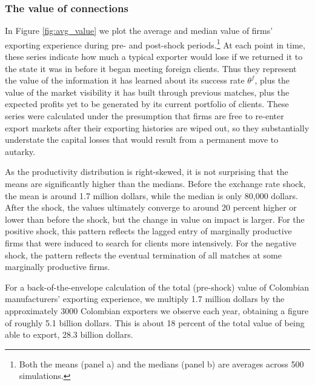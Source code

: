 \documentclass[12pt]{article}
\begin{document}
\subsubsection{The value of connections}

In Figure \ref{fig:avg_value} we plot the average and median value of firms' exporting experience during pre- and post-shock periods.\footnote{%
Both the means (panel a) and the medians (panel b) are averages across 500 simulations.} At each point in time, these series indicate how much a typical exporter would lose if we returned it to the state it was in before it began meeting foreign clients. Thus they represent the value of the information it has learned about its success rate $\theta ^{f}$, plus the value of the market visibility it has built through previous matches, plus the expected profits yet to be generated by its current portfolio of clients. These series were calculated under the presumption that firms are free to re-enter export markets after their exporting histories are wiped out, so they substantially understate the capital losses that would result from a permanent move to autarky.

As the productivity distribution is right-skewed, it is not surprising that the means are significantly higher than the medians. Before the exchange rate
shock, the mean is around 1.7 million dollars, while the median is only 80,000
dollars. After the shock, the values ultimately converge to
around 20 percent higher or lower than before the shock, but the change in
value on impact is larger. For the positive shock, this pattern reflects the lagged entry of marginally productive firms that were induced to search for clients more intensively. For the negative shock, the pattern reflects the eventual termination of all matches at some marginally productive firms.

For a back-of-the-envelope calculation of the total (pre-shock) value of Colombian manufacturers' exporting experience, we multiply 1.7 million dollars by the approximately 3000 Colombian exporters we observe each year, obtaining a figure of roughly 5.1 billion dollars. This is about 18 percent of the total value of being able to export, 28.3 billion dollars. 
\end{document}
